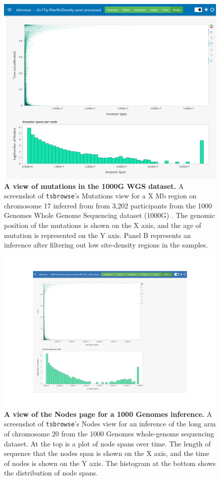 \documentclass[unnumsec,webpdf,contemporary,large,namedate]{oup-authoring-template}%
\begin{document}
\begin{figure}
    \centering
    \includegraphics[width=0.95\linewidth]{figures/SuppFig2.png}
    \caption{\textbf{A view of mutations in the 1000G WGS dataset.} A
screenshot of \texttt{tsbrowse}'s Mutations view for a X Mb region on
chromosome 17 inferred from from 3,202 participants from the 1000 Genomes Whole
Genome Sequencing dataset (1000G) \citep{1000G2015, 1000GWGS}. The genomic
position of the mutations is shown on the X axis, and the age of mutation is
represented on the Y axis. Panel B represents an inference after filtering out
low site-density regions in the samples.}
    \label{fig:Supplementary_Figure_2}
\end{figure}

\begin{figure}
    \centering
    \includegraphics[width=0.95\linewidth]{figures/SuppFig3.png}
    \caption{\textbf{A view of the Nodes page for a 1000 Genomes inference.} A
screenshot of \texttt{tsbrowse}'s Nodes view for an inference of the long arm
of chromosome 20 from the 1000 Genomes whole-genome sequencing dataset. At the
top is a plot of node spans over time. The length of sequence that the nodes
span is shown on the X axis, and the time of nodes is shown on the Y axis. The
histogram at the bottom shows the distribution of node spans. }
    \label{fig:Supplementary_Figure_3}
\end{figure}
\end{document}
